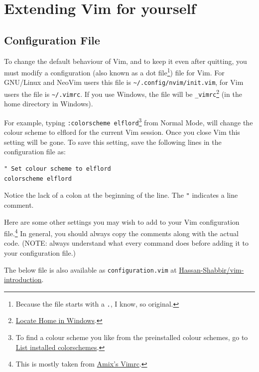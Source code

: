 \documentclass[11pt]{article}
\begin{document}
\section{Extending Vim for yourself}
\label{sec:orgf658c46}
\subsection{Configuration File}
\label{sec:orgd91b7eb}
To change the default behaviour of Vim, and to keep it even after quitting, you
must modify a configuration (also known as a dot file\footnote{Because the file starts with a \texttt{.}, I know, so original.}) file for Vim. For
GNU/Linux and NeoVim users this file is \texttt{\textasciitilde{}/.config/nvim/init.vim}, for Vim users
the file is \texttt{\textasciitilde{}/.vimrc}. If you use Windows, the file will be \texttt{\_vimrc}\footnote{\href{https://superuser.com/questions/86246/where-should-the-vimrc-file-be-located-on-windows-7}{Locate Home in Windows}.} (in
the home directory in Windows).

For example, typing \texttt{:colorscheme elflord}\footnote{To find a colour scheme you like from the preinstalled colour 
schemes, go to \href{https://stackoverflow.com/questions/7331940/how-to-get-the-list-of-all-installed-color-schemes-in-vim}{List installed colorschemes}.} from Normal Mode, will change
the colour scheme to elflord for the current Vim session. Once you close Vim
this setting will be gone. To save this setting, save the following lines in the
configuration file as:

\begin{verbatim}
" Set colour scheme to elflord 
colorscheme elflord 
\end{verbatim}

Notice the lack of a colon at the beginning of the line. The \texttt{"} indicates a
line comment.

Here are some other settings you may wish to add to your Vim configuration
file.\footnote{This is mostly taken from \href{https://github.com/amix/vimrc}{Amix's Vimrc}.} In general, you should always copy the comments along with the
actual code. (NOTE: always understand what every command does before adding it
to your configuration file.)

The below file is also available as \texttt{configuration.vim} at
\href{https://github.com/Hassan-Shabbir/vim-introduction}{Hassan-Shabbir/vim-introduction}.
\end{document}
